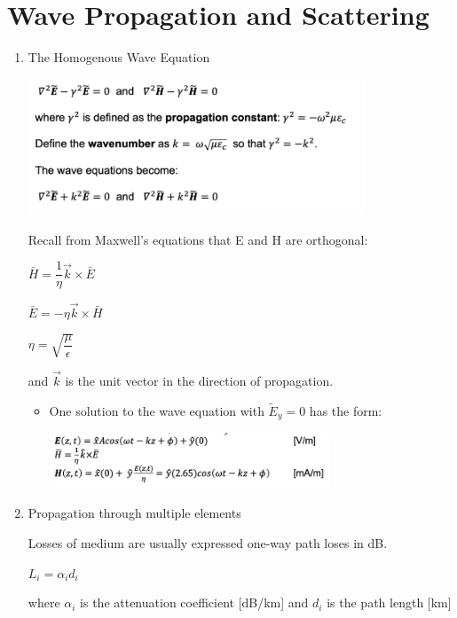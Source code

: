 \documentclass[10pt]{article}
\renewcommand{\frac}{\dfrac}
\begin{document}
\section*{Wave Propagation and Scattering}

\begin{enumerate}

	\item The Homogenous Wave Equation
	
	\includegraphics[width=0.79\textwidth]{figs/HomogenousWaveEqn.png}
	
	Recall from Maxwell's equations that E and H are orthogonal:
	
	\centerline{$\bar{H} = \frac{1}{\eta}\vec{k}\times \bar{E}$}
	
	\centerline{$\bar{E} = -\eta \vec{k} \times \bar{H}$}
	
	\centerline{$\eta = \sqrt{\frac{\mu}{\epsilon}}$}
	
	and $\vec{k}$ is the unit vector in the direction of propagation.
	
	\begin{itemize}
		\item One solution to the wave equation with $\tilde{E}_y = 0$ has the form:
		
		\includegraphics[width=0.69\textwidth]{figs/WaveSolution.png}
		
		
	\end{itemize}
	
	\item Propagation through multiple elements
	
	Losses of medium are usually expressed one-way path loses in dB.
	
	\centerline{$L_i = \alpha_i d_i$}
	
	where $\alpha_i$ is the attenuation coefficient [dB/km] and $d_i$ is the path length [km]
	

\end{enumerate}
\end{document}
